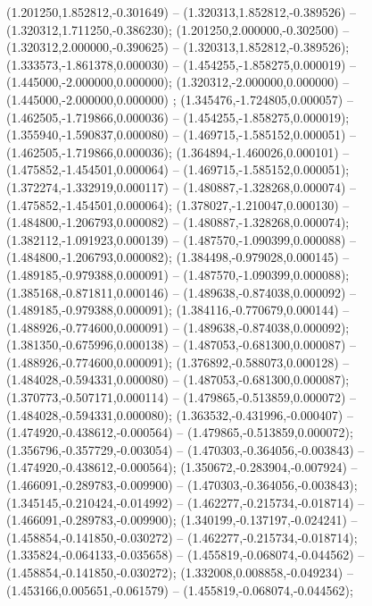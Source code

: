  (1.201250,1.852812,-0.301649) -- (1.320313,1.852812,-0.389526) -- (1.320312,1.711250,-0.386230);
 (1.201250,2.000000,-0.302500) -- (1.320312,2.000000,-0.390625) -- (1.320313,1.852812,-0.389526);
 (1.333573,-1.861378,0.000030) -- (1.454255,-1.858275,0.000019) -- (1.445000,-2.000000,0.000000);
 (1.320312,-2.000000,0.000000) -- (1.445000,-2.000000,0.000000) ;
 (1.345476,-1.724805,0.000057) -- (1.462505,-1.719866,0.000036) -- (1.454255,-1.858275,0.000019);
 (1.355940,-1.590837,0.000080) -- (1.469715,-1.585152,0.000051) -- (1.462505,-1.719866,0.000036);
 (1.364894,-1.460026,0.000101) -- (1.475852,-1.454501,0.000064) -- (1.469715,-1.585152,0.000051);
 (1.372274,-1.332919,0.000117) -- (1.480887,-1.328268,0.000074) -- (1.475852,-1.454501,0.000064);
 (1.378027,-1.210047,0.000130) -- (1.484800,-1.206793,0.000082) -- (1.480887,-1.328268,0.000074);
 (1.382112,-1.091923,0.000139) -- (1.487570,-1.090399,0.000088) -- (1.484800,-1.206793,0.000082);
 (1.384498,-0.979028,0.000145) -- (1.489185,-0.979388,0.000091) -- (1.487570,-1.090399,0.000088);
 (1.385168,-0.871811,0.000146) -- (1.489638,-0.874038,0.000092) -- (1.489185,-0.979388,0.000091);
 (1.384116,-0.770679,0.000144) -- (1.488926,-0.774600,0.000091) -- (1.489638,-0.874038,0.000092);
 (1.381350,-0.675996,0.000138) -- (1.487053,-0.681300,0.000087) -- (1.488926,-0.774600,0.000091);
 (1.376892,-0.588073,0.000128) -- (1.484028,-0.594331,0.000080) -- (1.487053,-0.681300,0.000087);
 (1.370773,-0.507171,0.000114) -- (1.479865,-0.513859,0.000072) -- (1.484028,-0.594331,0.000080);
 (1.363532,-0.431996,-0.000407) -- (1.474920,-0.438612,-0.000564) -- (1.479865,-0.513859,0.000072);
 (1.356796,-0.357729,-0.003054) -- (1.470303,-0.364056,-0.003843) -- (1.474920,-0.438612,-0.000564);
 (1.350672,-0.283904,-0.007924) -- (1.466091,-0.289783,-0.009900) -- (1.470303,-0.364056,-0.003843);
 (1.345145,-0.210424,-0.014992) -- (1.462277,-0.215734,-0.018714) -- (1.466091,-0.289783,-0.009900);
 (1.340199,-0.137197,-0.024241) -- (1.458854,-0.141850,-0.030272) -- (1.462277,-0.215734,-0.018714);
 (1.335824,-0.064133,-0.035658) -- (1.455819,-0.068074,-0.044562) -- (1.458854,-0.141850,-0.030272);
 (1.332008,0.008858,-0.049234) -- (1.453166,0.005651,-0.061579) -- (1.455819,-0.068074,-0.044562);
